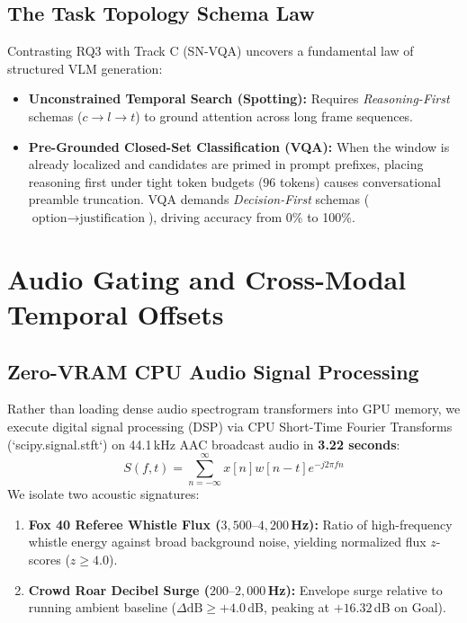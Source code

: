 \documentclass[10pt,twocolumn,letterpaper]{article}
\begin{document}
\subsection{The Task Topology Schema Law}
Contrasting RQ3 with Track C (SN-VQA) uncovers a fundamental law of structured VLM generation:
\begin{itemize}
    \item \textbf{Unconstrained Temporal Search (Spotting):} Requires \textit{Reasoning-First} schemas ($c \to l \to t$) to ground attention across long frame sequences.
    \item \textbf{Pre-Grounded Closed-Set Classification (VQA):} When the window is already localized and candidates are primed in prompt prefixes, placing reasoning first under tight token budgets ($96$ tokens) causes conversational preamble truncation. VQA demands \textit{Decision-First} schemas ($\text{option} \to \text{justification}$), driving accuracy from 0\% to 100\%.
\end{itemize}

\section{Audio Gating and Cross-Modal Temporal Offsets}
\label{sec:rq4}

\subsection{Zero-VRAM CPU Audio Signal Processing}
Rather than loading dense audio spectrogram transformers into GPU memory, we execute digital signal processing (DSP) via CPU Short-Time Fourier Transforms (`scipy.signal.stft`) on 44.1\,kHz AAC broadcast audio in \textbf{3.22 seconds}:
\begin{equation}
    S(f, t) = \sum_{n=-\infty}^{\infty} x[n] w[n-t] e^{-j 2\pi f n}
\end{equation}
We isolate two acoustic signatures:
\begin{enumerate}
    \item \textbf{Fox 40 Referee Whistle Flux ($3,500\text{--}4,200$\,Hz):} Ratio of high-frequency whistle energy against broad background noise, yielding normalized flux $z$-scores ($z \ge 4.0$).
    \item \textbf{Crowd Roar Decibel Surge ($200\text{--}2,000$\,Hz):} Envelope surge relative to running ambient baseline ($\Delta\text{dB} \ge +4.0$\,dB, peaking at $+16.32$\,dB on Goal).
\end{enumerate}
\end{document}
